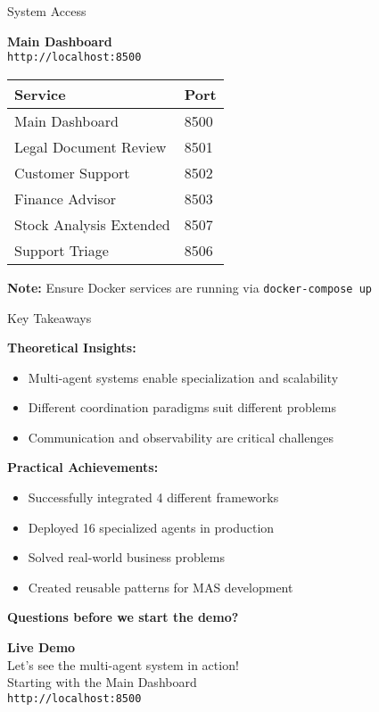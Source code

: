 \documentclass[aspectratio=169,11pt]{beamer}
\begin{document}
\begin{frame}{System Access}
\begin{center}
\Large
\textbf{Main Dashboard}\\
\vspace{0.3cm}
 \texttt{http://localhost:8500}\\
\vspace{1cm}

\normalsize
\begin{tabular}{ll}
\toprule
\textbf{Service} & \textbf{Port} \\
\midrule
Main Dashboard & 8500 \\
Legal Document Review & 8501 \\
Customer Support & 8502 \\
Finance Advisor & 8503 \\
Stock Analysis Extended & 8507 \\
Support Triage & 8506 \\
\bottomrule
\end{tabular}
\end{center}

\vspace{0.5cm}
\textbf{Note:} Ensure Docker services are running via \texttt{docker-compose up}
\end{frame}

\begin{frame}{Key Takeaways}

\textbf{Theoretical Insights:}
\begin{itemize}
    \item Multi-agent systems enable specialization and scalability
    \item Different coordination paradigms suit different problems
    \item Communication and observability are critical challenges
\end{itemize}

\vspace{0.3cm}

\textbf{Practical Achievements:}
\begin{itemize}
    \item Successfully integrated 4 different frameworks
    \item Deployed 16 specialized agents in production
    \item Solved real-world business problems
    \item Created reusable patterns for MAS development
\end{itemize}

\vspace{0.5cm}
\begin{center}
\Large
\textbf{Questions before we start the demo?}
\end{center}
\end{frame}

\begin{frame}
\begin{center}
\Huge
\textbf{Live Demo}\\
\vspace{1cm}
\Large
Let's see the multi-agent system in action!\\
\vspace{0.5cm}
\normalsize
Starting with the Main Dashboard\\
\texttt{http://localhost:8500}
\end{center}
\end{frame}
\end{document}

